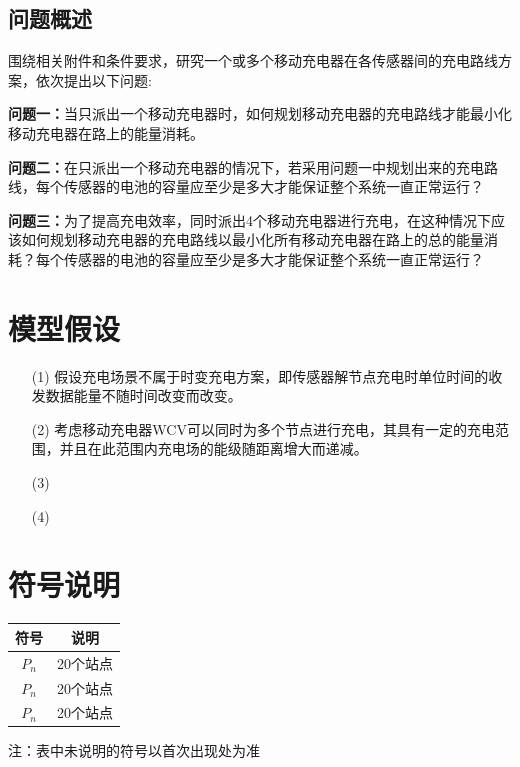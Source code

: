 \documentclass{whutmod}
\begin{document}
		\subsection{问题概述}
		    围绕相关附件和条件要求，研究一个或多个移动充电器在各传感器间的充电路线方案，依次提出以下问题:
				 
			
			\textbf{问题一：}当只派出一个移动充电器时，如何规划移动充电器的充电路线才能最小化移动充电器在路上的能量消耗。
			
			\textbf{问题二：}在只派出一个移动充电器的情况下，若采用问题一中规划出来的充电路线，每个传感器的电池的容量应至少是多大才能保证整个系统一直正常运行？
			
			\textbf{问题三：}为了提高充电效率，同时派出4个移动充电器进行充电，在这种情况下应该如何规划移动充电器的充电路线以最小化所有移动充电器在路上的总的能量消耗？每个传感器的电池的容量应至少是多大才能保证整个系统一直正常运行？

	
	\section{模型假设}
		\begin{itemize}                                             
		\item [(1)] 假设充电场景不属于时变充电方案，即传感器解节点充电时单位时间的收发数据能量不随时间改变而改变。
		\item [(2)] 考虑移动充电器WCV可以同时为多个节点进行充电，其具有一定的充电范围，并且在此范围内充电场的能级随距离增大而递减。
		\item [(3)] 
		\item [(4)] 
		\end{itemize}

		
	\section{符号说明}
		\begin{table}[H]
		\centering
		\setlength{\tabcolsep}{12mm}
		\begin{tabular}{cc}
			\toprule[1.5pt]
			\multicolumn{1}{m{5cm}}{\centering 符号} & \multicolumn{1}{m{5cm}}{\centering 说明} \\
			\midrule[1pt]		
			$P_n$  & 20个站点  \\ 
			$P_n$  & 20个站点  \\ 
		   	$P_n$  & 20个站点  \\ 
			\bottomrule[1.5pt]
		\end{tabular}
		\begin{tablenotes}
		\item 注：表中未说明的符号以首次出现处为准
		\end{tablenotes}
		\end{table}
\end{document}
